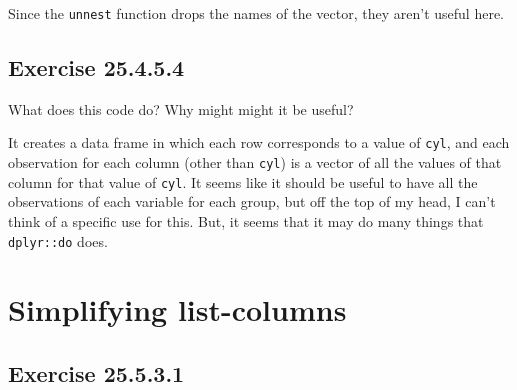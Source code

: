 \documentclass[]{book}
\newenvironment{Shaded}{\begin{snugshade}}{\end{snugshade}}
\newcommand{\CommentTok}[1]{\textcolor[rgb]{0.56,0.35,0.01}{\textit{#1}}}
\newcommand{\KeywordTok}[1]{\textcolor[rgb]{0.13,0.29,0.53}{\textbf{#1}}}
\newcommand{\NormalTok}[1]{#1}
\newcommand{\OperatorTok}[1]{\textcolor[rgb]{0.81,0.36,0.00}{\textbf{#1}}}
\newcommand{\StringTok}[1]{\textcolor[rgb]{0.31,0.60,0.02}{#1}}
\theoremstyle{plain}
\theoremstyle{remark}
\begin{document}
Since the \texttt{unnest} function drops the names of the vector, they
aren't useful here.

\hypertarget{exercise-25.4.5.4}{%
\subsection*{\texorpdfstring{Exercise
{25.4.5.4}}{Exercise 25.4.5.4}}\label{exercise-25.4.5.4}}

What does this code do? Why might might it be useful?

\begin{Shaded}
\end{Shaded}

It creates a data frame in which each row corresponds to a value of
\texttt{cyl}, and each observation for each column (other than
\texttt{cyl}) is a vector of all the values of that column for that
value of \texttt{cyl}. It seems like it should be useful to have all the
observations of each variable for each group, but off the top of my
head, I can't think of a specific use for this. But, it seems that it
may do many things that \texttt{dplyr::do} does.

\hypertarget{simplifying-list-columns}{%
\section{Simplifying list-columns}\label{simplifying-list-columns}}

\hypertarget{exercise-25.5.3.1}{%
\subsection*{\texorpdfstring{Exercise
{25.5.3.1}}{Exercise 25.5.3.1}}\label{exercise-25.5.3.1}}
\end{document}
